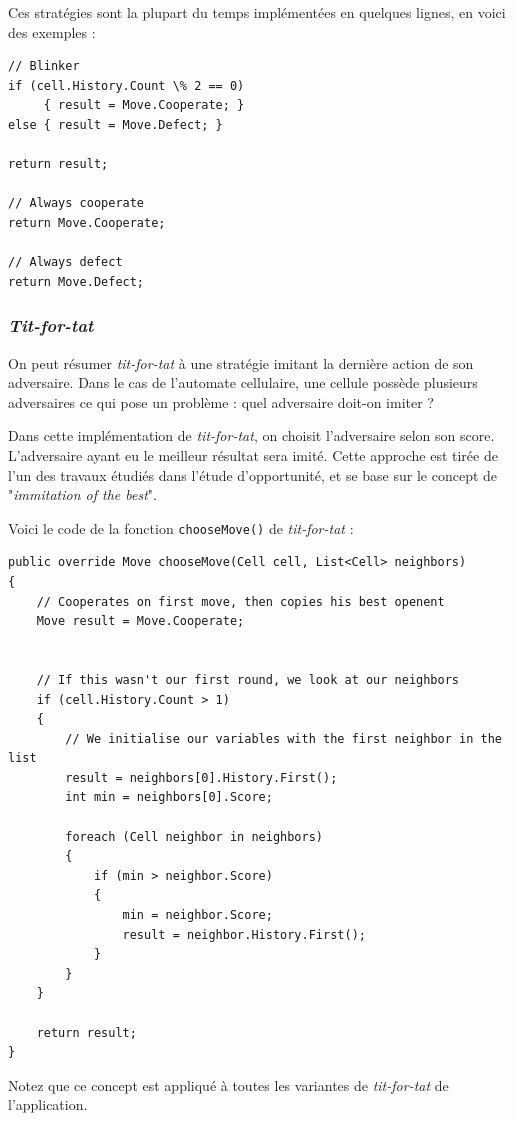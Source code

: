 \documentclass[a4paper]{article}
\begin{document}
Ces stratégies sont la plupart du temps implémentées en quelques lignes, en voici des exemples :

\begin{lstlisting}
// Blinker
if (cell.History.Count \% 2 == 0)
     { result = Move.Cooperate; }
else { result = Move.Defect; }

return result;

// Always cooperate
return Move.Cooperate;

// Always defect
return Move.Defect;
\end{lstlisting}

\subsubsection{\textit{Tit-for-tat}}
On peut résumer \textit{tit-for-tat} à une stratégie imitant la dernière action de son adversaire. Dans le cas de l'automate cellulaire, une cellule possède plusieurs adversaires ce qui pose un problème : quel adversaire doit-on imiter ?

Dans cette implémentation de \textit{tit-for-tat}, on choisit l'adversaire selon son score. L'adversaire ayant eu le meilleur résultat sera imité. Cette approche est tirée de l'un des travaux étudiés dans l'étude d'opportunité, et se base sur le concept de "\textit{immitation of the best}".

Voici le code de la fonction \texttt{chooseMove()} de \textit{tit-for-tat} :

\begin{lstlisting}
public override Move chooseMove(Cell cell, List<Cell> neighbors)
{
    // Cooperates on first move, then copies his best openent
    Move result = Move.Cooperate;


    // If this wasn't our first round, we look at our neighbors
    if (cell.History.Count > 1)
    {
        // We initialise our variables with the first neighbor in the list
        result = neighbors[0].History.First();
        int min = neighbors[0].Score;

        foreach (Cell neighbor in neighbors)
        {
            if (min > neighbor.Score)
            {
                min = neighbor.Score;
                result = neighbor.History.First();
            }
        }
    }

    return result;
}
\end{lstlisting}

Notez que ce concept est appliqué à toutes les variantes de \textit{tit-for-tat} de l'application.
\end{document}
